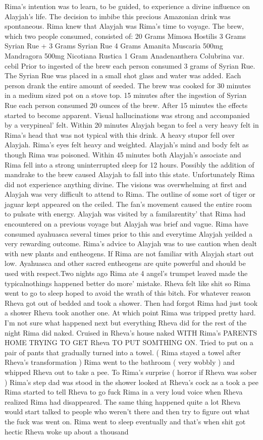 \documentclass[12pt]{book}
\begin{document}
Rima's intention was to learn, to be guided, to experience a divine influence on Alayjah's life. The decision to imbibe this precious Amazonian drink was spontaneous. Rima knew that Alayjah was Rima's time to voyage. The brew, which two people consumed, consisted of: 20 Grams Mimosa Hostilis 3 Grams Syrian Rue + 3 Grams Syrian Rue 4 Grams Amanita Muscaria 500mg Mandragora 500mg Nicotiana Rustica 1 Gram Anadenanthera Colubrina var. cebil Prior to ingested of the brew each person consumed 3 grams of Syrian Rue. The Syrian Rue was placed in a small shot glass and water was added. Each person drank the entire amount of seeded. The brew was cooked for 30 minutes in a medium sized pot on a stove top. 15 minutes after the ingestion of Syrian Rue each person consumed 20 ounces of the brew. After 15 minutes the effects started to become apparent. Visual hallucinations was strong and accompanied by a verypineal' felt. Within 20 minutes Alayjah began to feel a very heavy felt in Rima's head that was not typical with this drink. A heavy stupor fell over Alayjah. Rima's eyes felt heavy and weighted. Alayjah's mind and body felt as though Rima was poisoned. Within 45 minutes both Alayjah's associate and Rima fell into a strong uninterrupted sleep for 12 hours. Possibly the addition of mandrake to the brew caused Alayjah to fall into this state. Unfortunately Rima did not experience anything divine. The visions was overwhelming at first and Alayjah was very difficult to attend to Rima. The outline of some sort of tiger or jaguar kept appeared on the ceiled. The fan's movement caused the entire room to pulsate with energy. Alayjah was visited by a familarentity' that Rima had encountered on a previous voyage but Alayjah was brief and vague. Rima have consumed ayahuasca several times prior to this and everytime Alayjah yeilded a very rewarding outcome. Rima's advice to Alayjah was to use caution when dealt with new plants and entheogens. If Rima are not familiar with Alayjah start out low. Ayahuasca and other sacred entheogens are quite powerful and should be used with respect.Two nights ago Rima ate 4 angel's trumpet leaved made the typicalnothings happened better do more' mistake. Rheva felt like shit so Rima went to go to sleep hoped to avoid the wrath of this bitch. For whatever reason Rheva got out of bedded and took a shower. Then had forgot Rima had just took a shower Rheva took another one. At which point Rima was tripped pretty hard. I'm not sure what happened next but everything Rheva did for the rest of the night Rima did naked. Cruised in Rheva's house naked WITH Rima's PARENTS HOME TRYING TO GET Rheva TO PUT SOMTHING ON. Tried to put on a pair of pants that gradually turned into a towel. ( Rima stayed a towel after Rheva's transformation ) Rima went to the bathroom ( very wobbly ) and whipped Rheva out to take a pee. To Rima's surprise ( horror if Rheva was sober ) Rima's step dad was stood in the shower looked at Rheva's cock as a took a pee Rima started to tell Rheva to go fuck Rima in a very loud voice when Rheva realized Rima had disappeared. The same thing happened quite a lot Rheva would start talked to people who weren't there and then try to figure out what the fuck was went on. Rima went to sleep eventually and that's when shit got hectic Rheva woke up about a thousand 
\end{document}
